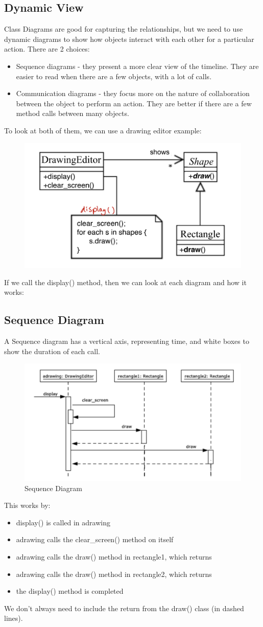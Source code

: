 \documentclass{article}
\begin{document}
\subsection{Dynamic View}
Class Diagrams are good for capturing the relationships, but we need to use dynamic diagrams to show how objects interact with each other for a particular action. There are 2 choices:
\begin{itemize}
    \item Sequence diagrams - they present a more clear view of the timeline. They are easier to read when there are a few objects, with a lot of calls.
    \item Communication diagrams - they focus more on the nature of collaboration between the object to perform an action. They are better if there are a few method calls between many objects.
\end{itemize}
To look at both of them, we can use a drawing editor example:
\begin{figure}[H]
\centering
\includegraphics[width = 0.5\linewidth]{Pictures/Screenshot 2023-01-27 at 12.46.49.png}
\end{figure}
If we call the display() method, then we can look at each diagram and how it works:
\subsection{Sequence Diagram}
A Sequence diagram has a vertical axis, representing time, and white boxes to show the duration of each call.
\begin{figure}[H]
\centering
\includegraphics[width = 0.6\linewidth]{Pictures/Screenshot 2023-01-27 at 12.48.22.png}
\caption{Sequence Diagram}
\end{figure}
This works by:
\begin{itemize}
    \item display() is called in adrawing
    \item adrawing calls the clear\_screen() method on itself
    \item adrawing calls the draw() method in rectangle1, which returns
    \item adrawing calls the draw() method in rectangle2, which returns
    \item the display() method is completed
\end{itemize}
We don't always need to include the return from the draw() class (in dashed lines).
\end{document}
